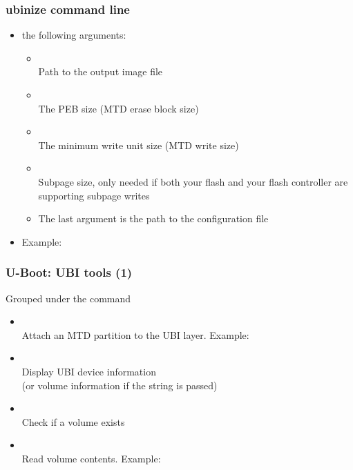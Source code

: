 \begin{frame}
  \frametitle{ubinize command line}
  \begin{itemize}
  \item {} the following arguments:
    \begin{itemize}
    \item {}\\
	Path to the output image file
    \item {}\\
	The PEB size (MTD erase block size)
    \item {}\\
	The minimum write unit size (MTD write size)
    \item {}\\
	Subpage size, only needed if both your flash and your
	flash controller are supporting subpage writes
    \item The last argument is the path to the 
	  configuration file
    \end{itemize}
  \item Example: 
  \end{itemize}
\end{frame}

\begin{frame}
  \frametitle{U-Boot: UBI tools (1)}
  Grouped under the  command
    \begin{itemize}
    \item {}\\
	Attach an MTD partition to the UBI layer. Example:\\
    \item {}\\
	Display UBI device information\\
	(or volume information if the  string is passed)
    \item {}\\
	Check if a volume exists
    \item {}\\
	Read volume contents. Example:\\
    \end{itemize}
\end{frame}

